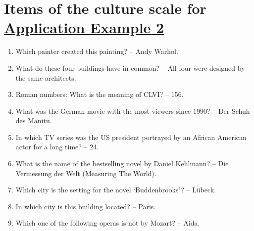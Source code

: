 \documentclass[doc,floatsintext,natbib]{apa7}
\begin{document}



\newpage
\appendix



%
%


\section{Items of the culture scale for \hyperref[sec:TutorialRasch]{Application Example 2}}
\label{sec:AppendixA}

\begin{enumerate}
\item Which painter created this painting? – Andy Warhol.
\item What do these four buildings have in common? – All four were designed by the same architects.
\item Roman numbers: What is the meaning of CLVI? – 156.
\item What was the German movie with the most viewers since 1990? – Der Schuh des Manitu.
\item In which TV series was the US president portrayed by an African American actor for a long time? – 24.
\item What is the name of the bestselling novel by Daniel Kehlmann? – Die Vermessung der Welt (Measuring The World).
\item Which city is the setting for the novel ‘Buddenbrooks’? – Lübeck.
\item In which city is this building located? – Paris.
\item Which one of the following operas is not by Mozart? – Aida.
\end{enumerate}
\end{document}
